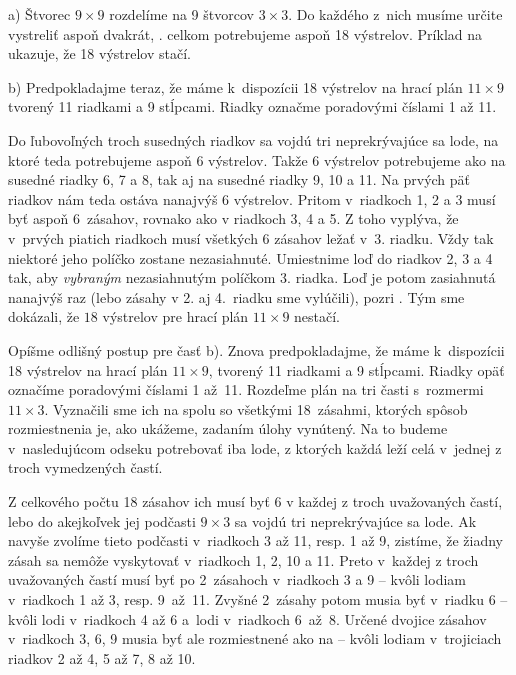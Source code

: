 {%
a) Štvorec $9\times 9$ rozdelíme na 9 štvorcov
$3\times 3$. Do každého z~nich musíme určite vystreliť aspoň
dvakrát, \tj. celkom potrebujeme aspoň 18 výstrelov.
Príklad na \obr{} ukazuje, že 18 výstrelov stačí.
%

b) Predpokladajme teraz, že máme k~dispozícii 18 výstrelov na hrací
plán $11\times 9$ tvorený 11 riadkami a 9 stĺpcami.
Riadky označme poradovými číslami 1 až 11.

Do ľubovoľných troch susedných riadkov sa vojdú tri neprekrývajúce sa lode,
na ktoré teda potrebujeme aspoň 6 výstrelov.
Takže 6 výstrelov potrebujeme ako na susedné riadky 6, 7 a 8,
tak aj na susedné riadky 9, 10 a 11. Na prvých päť riadkov nám
teda ostáva nanajvýš 6 výstrelov. Pritom v~riadkoch 1, 2 a 3 musí
byť aspoň 6~zásahov, rovnako ako v riadkoch 3, 4 a 5. Z toho
vyplýva, že v~prvých piatich riadkoch musí všetkých 6 zásahov ležať
v~3. riadku. Vždy tak niektoré jeho políčko zostane nezasiahnuté.
Umiestnime loď do riadkov 2, 3 a 4 tak, aby 
\emph{vybraným} nezasiahnutým políčkom 3. riadka. Loď je potom zasiahnutá
nanajvýš raz (lebo zásahy v 2. aj 4.~riadku sme vylúčili),
pozri \obr. Tým sme dokázali, že $18$ výstrelov pre hrací plán
$11\times 9$ nestačí.
%


\Jres
Opíšme odlišný postup pre časť b).
Znova predpokladajme, že máme k~dispozícii 18 výstrelov na hrací
plán $11\times 9$, tvorený 11 riadkami a 9 stĺpcami. Riadky opäť
označíme poradovými číslami 1 až~11. Rozdeľme plán na tri časti
s~rozmermi ${11\times 3}$. Vyznačili sme ich na \obr{}
spolu so všetkými 18~zásahmi, ktorých spôsob rozmiestnenia je,
ako ukážeme, zadaním úlohy vynútený. Na to budeme v~nasledujúcom odseku
potrebovať iba lode, z ktorých každá leží celá v~jednej z
troch vymedzených častí.
%

Z celkového počtu 18 zásahov ich musí byť 6 v každej z
troch uvažovaných častí, lebo do akejkoľvek jej podčasti
$9\times3$ sa vojdú tri neprekrývajúce sa lode.
Ak navyše zvolíme
tieto podčasti v~riadkoch 3 až 11, resp. 1 až 9,
zistíme, že žiadny zásah sa nemôže vyskytovať v~riadkoch 1, 2, 10 a
11. Preto v~každej z troch uvažovaných častí musí byť po
2~zásahoch v~riadkoch 3 a 9 -- kvôli lodiam v~riadkoch 1 až 3,
resp. 9~až~11. Zvyšné 2~zásahy potom musia byť v~riadku 6 --
kvôli lodi v~riadkoch 4 až 6 a~lodi
v~riadkoch 6~až~8. Určené dvojice zásahov v~riadkoch 3, 6, 9
musia byť ale rozmiestnené ako na  -- kvôli lodiam v~trojiciach
riadkov 2 až 4, 5 až 7, 8 až 10.

}
